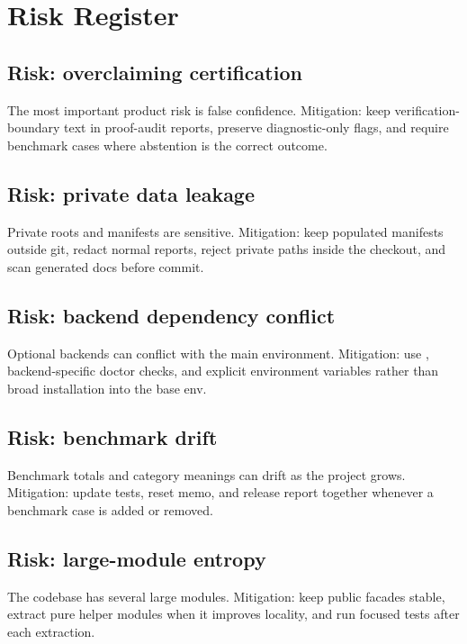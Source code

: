 \documentclass[12pt,a4paper,openany]{book}
\begin{document}
\chapter{Risk Register}

\section{Risk: overclaiming certification}

The most important product risk is false confidence. Mitigation: keep
verification-boundary text in proof-audit reports, preserve diagnostic-only
flags, and require benchmark cases where abstention is the correct outcome.

\section{Risk: private data leakage}

Private roots and manifests are sensitive. Mitigation: keep populated manifests
outside git, redact normal reports, reject private paths inside the checkout,
and scan generated docs before commit.

\section{Risk: backend dependency conflict}

Optional backends can conflict with the main environment. Mitigation: use
, backend-specific doctor checks, and explicit
environment variables rather than broad installation into the base env.

\section{Risk: benchmark drift}

Benchmark totals and category meanings can drift as the project grows.
Mitigation: update tests, reset memo, and release report together whenever a
benchmark case is added or removed.

\section{Risk: large-module entropy}

The codebase has several large modules. Mitigation: keep public facades stable,
extract pure helper modules when it improves locality, and run focused tests
after each extraction.
\end{document}
